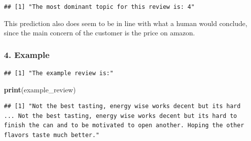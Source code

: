 \documentclass[
]{article}
\newenvironment{Shaded}{\begin{snugshade}}{\end{snugshade}}
\newcommand{\CommentTok}[1]{\textcolor[rgb]{0.56,0.35,0.01}{\textit{#1}}}
\newcommand{\DecValTok}[1]{\textcolor[rgb]{0.00,0.00,0.81}{#1}}
\newcommand{\FloatTok}[1]{\textcolor[rgb]{0.00,0.00,0.81}{#1}}
\newcommand{\FunctionTok}[1]{\textcolor[rgb]{0.13,0.29,0.53}{\textbf{#1}}}
\newcommand{\NormalTok}[1]{#1}
\newcommand{\OtherTok}[1]{\textcolor[rgb]{0.56,0.35,0.01}{#1}}
\newcommand{\SpecialCharTok}[1]{\textcolor[rgb]{0.81,0.36,0.00}{\textbf{#1}}}
\newcommand{\StringTok}[1]{\textcolor[rgb]{0.31,0.60,0.02}{#1}}
\begin{document}
\begin{verbatim}
## [1] "The most dominant topic for this review is: 4"
\end{verbatim}

This prediction also does seem to be in line with what a human would
conclude, since the main concern of the customer is the price on amazon.

\hypertarget{example-3}{%
\subsubsection{4. Example}\label{example-3}}

\begin{Shaded}
\end{Shaded}

\begin{verbatim}
## [1] "The example review is:"
\end{verbatim}

\begin{Shaded}
\begin{Highlighting}[]
\FunctionTok{print}\NormalTok{(example\_review)}
\end{Highlighting}
\end{Shaded}

\begin{verbatim}
## [1] "Not the best tasting, energy wise works decent but its hard ... Not the best tasting, energy wise works decent but its hard to finish the can and to be motivated to open another. Hoping the other flavors taste much better."
\end{verbatim}

\begin{Shaded}
\end{Shaded}
\end{document}
